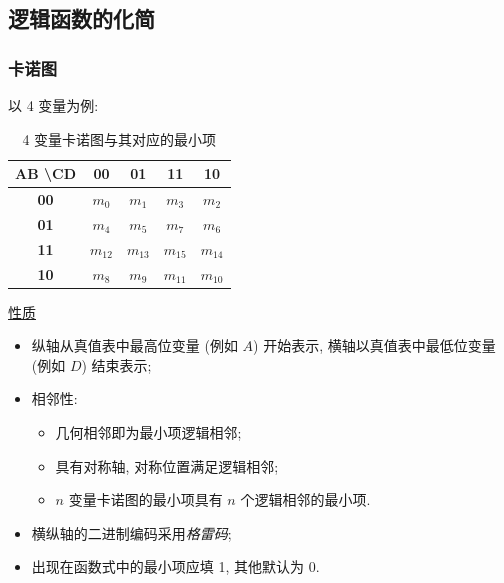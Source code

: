 \subsection{逻辑函数的化简}
\subsubsection{卡诺图}
以 4 变量为例:
\begin{table}[H]
    \caption{4 变量卡诺图与其对应的最小项}
    \centering
    \begin{tabular}{|c|c|c|c|c|} \hline
        \bfseries AB \textbackslash CD & \bfseries 00 & \bfseries 01 & \bfseries 11 & \bfseries 10 \\\hline
        \bfseries 00                   & $m_0$        & $m_1$        & $m_3$        & $m_2$        \\\hline
        \bfseries 01                   & $m_4$        & $m_5$        & $m_7$        & $m_6$        \\\hline
        \bfseries 11                   & $m_{12}$     & $m_{13}$     & $m_{15}$     & $m_{14}$     \\\hline
        \bfseries 10                   & $m_8$        & $m_9$        & $m_{11}$     & $m_{10}$     \\\hline
    \end{tabular}
\end{table}

\underline{性质}
\begin{itemize}
    \item 纵轴从真值表中最高位变量 (例如 $A$) 开始表示, 横轴以真值表中最低位变量 (例如 $D$) 结束表示;
    \item 相邻性:
          \begin{itemize}
              \item 几何相邻即为最小项逻辑相邻;
              \item 具有对称轴, 对称位置满足逻辑相邻;
              \item $n$ 变量卡诺图的最小项具有 $n$ 个逻辑相邻的最小项.
          \end{itemize}
    \item 横纵轴的二进制编码采用\textit{格雷码};
    \item 出现在函数式中的最小项应填 1, 其他默认为 0.
\end{itemize}

